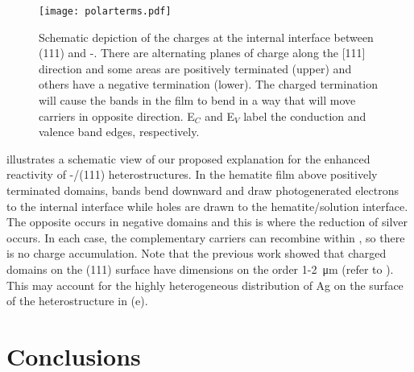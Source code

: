 \begin{figure}
\begin{center}
\texttt{[image: polarterms.pdf]}
\caption[Charges at internal interface between  and ]{%
		Schematic depiction of the charges at the internal interface 
		between (111) and \textalpha-. There are 
		alternating planes of charge along the [111] direction and some 
		areas are positively terminated (upper) and others have a negative 
		termination (lower). The charged termination will cause the bands 
		in the film to bend in a way that will move carriers in opposite 
		direction. E$_C$ and E$_V$ label the conduction and valence band 
		edges, respectively.}
\label{fig:polarterms}
\end{center}
\end{figure}
 illustrates a schematic view of our proposed explanation for the enhanced reactivity of \textalpha-/(111) heterostructures. In the hematite film above positively terminated domains, bands bend downward and draw photogenerated electrons to the internal interface while holes are drawn to the hematite/solution interface.  The opposite occurs in negative domains and this is where the reduction of silver occurs.  In each case, the complementary carriers can recombine within , so there is no charge accumulation.  Note that the previous work showed that charged domains on the (111) surface have dimensions on the order 1-2~\si{\micro\meter} (refer to ).  This may account for the highly heterogeneous distribution of Ag on the surface of the heterostructure in (e).


\section{Conclusions}
\label{sec:single.crystal.conclusions}


